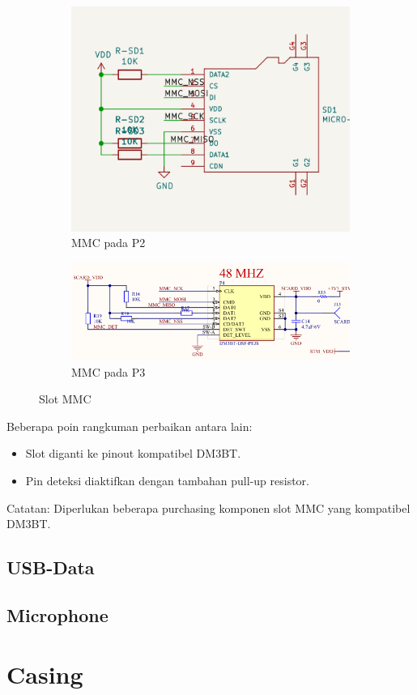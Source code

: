 \documentclass{book} %
\begin{document}
    \begin{figure}[!ht]
    	\centering
    	\begin{subfigure}[t]{0.25\textwidth}
    		\includegraphics[width=\textwidth]{images/p2_mmc}
    		\caption{MMC pada P2}
    	\end{subfigure}
    	\begin{subfigure}[t]{0.60\textwidth}
    		\includegraphics[width=\textwidth]{images/p3_mmc}
    		\caption{MMC pada P3}
    	\end{subfigure}
    	\caption{Slot MMC}
    \end{figure}

	Beberapa poin rangkuman perbaikan antara lain:
	\begin{itemize}
		\item Slot diganti ke pinout kompatibel DM3BT.
		\item Pin deteksi diaktifkan dengan tambahan pull-up resistor.
	\end{itemize}

	Catatan: Diperlukan beberapa purchasing komponen slot MMC yang kompatibel DM3BT.
    
    \section{USB-Data}
    
    \section{Microphone}
    
    \chapter{Casing}
\end{document}

